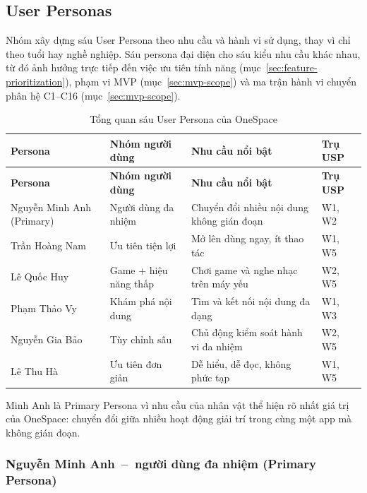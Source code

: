 \subsection{User Personas}
\label{sec:user-personas}

Nhóm xây dựng sáu User Persona theo nhu cầu và hành vi sử dụng, thay vì chỉ theo tuổi hay nghề nghiệp. Sáu persona đại diện cho sáu kiểu nhu cầu khác nhau, từ đó ảnh hưởng trực tiếp đến việc ưu tiên tính năng (mục~\ref{sec:feature-prioritization}), phạm vi MVP (mục~\ref{sec:mvp-scope}) và ma trận hành vi chuyển phân hệ C1--C16 (mục~\ref{sec:mvp-scope}).

\begin{longtable}{>{\raggedright\arraybackslash}p{2.4cm} >{\raggedright\arraybackslash}p{3.4cm} >{\raggedright\arraybackslash}p{3.0cm} >{\raggedright\arraybackslash}p{4.2cm}}
\caption{Tổng quan sáu User Persona của OneSpace}
\label{tab:persona-overview}\\
\toprule
\textbf{Persona} & \textbf{Nhóm người dùng} & \textbf{Nhu cầu nổi bật} & \textbf{Trụ USP} \\
\midrule
\endfirsthead
\toprule
\textbf{Persona} & \textbf{Nhóm người dùng} & \textbf{Nhu cầu nổi bật} & \textbf{Trụ USP} \\
\midrule
\endhead
\bottomrule
\endfoot
Nguyễn Minh Anh \newline (Primary) & Người dùng đa nhiệm & Chuyển đổi nhiều nội dung không gián đoạn & W1, W2 \\
\midrule
Trần Hoàng Nam & Ưu tiên tiện lợi & Mở lên dùng ngay, ít thao tác & W1, W5 \\
\midrule
Lê Quốc Huy & Game + hiệu năng thấp & Chơi game và nghe nhạc trên máy yếu & W2, W5 \\
\midrule
Phạm Thảo Vy & Khám phá nội dung & Tìm và kết nối nội dung đa dạng & W1, W3 \\
\midrule
Nguyễn Gia Bảo & Tùy chỉnh sâu & Chủ động kiểm soát hành vi đa nhiệm & W2, W5 \\
\midrule
Lê Thu Hà & Ưu tiên đơn giản & Dễ hiểu, dễ đọc, không phức tạp & W1, W5 \\
\end{longtable}

Minh Anh là Primary Persona vì nhu cầu của nhân vật thể hiện rõ nhất giá trị của OneSpace: chuyển đổi giữa nhiều hoạt động giải trí trong cùng một app mà không gián đoạn.

\subsubsection{Nguyễn Minh Anh~--~người dùng đa nhiệm (Primary Persona)}
\label{sec:persona-minhanh}


